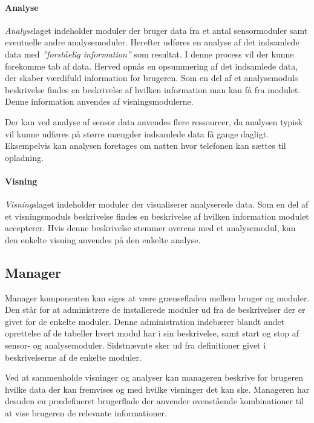\paragraph{Analyse}
\textit{Analyse}laget indeholder moduler der bruger data fra et antal sensormoduler samt eventuelle andre analysemoduler.
Herefter udføres en analyse af det indsamlede data med \textit{''forståelig information''} som resultat.
I denne process vil der kunne forekomme tab af data.
Herved opnås en opsummering af det indsamlede data, der skaber værdifuld information for brugeren.
Som en del af et analysemoduls beskrivelse findes en beskrivelse af hvilken information man kan få fra modulet.
Denne information anvendes af visningsmodulerne.

Der kan ved analyse af sensor data anvendes flere ressourcer, da analysen typisk vil kunne udføres på større mængder indsamlede data få gange dagligt.
Eksempelvis kan analysen foretages om natten hvor telefonen kan sættes til opladning.

\paragraph{Visning}
\textit{Visnings}laget indeholder moduler der visualiserer analyserede data.
Som en del af et visningsmoduls beskrivelse findes en beskrivelse af hvilken information modulet accepterer.
Hvis denne beskrivelse stemmer overens med et analysemodul, kan den enkelte visning anvendes på den enkelte analyse.

\subsection*{Manager}\label{subsec:arkitektur-Manager}
Manager komponenten kan siges at være grænsefladen mellem bruger og moduler.
Den står for at administrere de installerede moduler ud fra de beskrivelser der er givet for de enkelte moduler.
Denne administration indebærer blandt andet oprettelse af de tabeller hvert modul har i sin beskrivelse, samt start og stop af sensor- og analysemoduler.
Sidstnævnte sker ud fra definitioner givet i beskrivelserne af de enkelte moduler.

Ved at sammenholde visninger og analyser kan manageren beskrive for brugeren hvilke data der kan fremvises og med hvilke visninger det kan ske.
Manageren har desuden en prædefineret brugerflade der anvender ovenstående kombinationer til at vise brugeren de relevante informationer.


